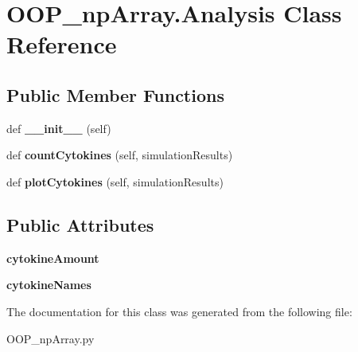 \hypertarget{class_o_o_p__np_array_1_1_analysis}{}\section{O\+O\+P\+\_\+np\+Array.\+Analysis Class Reference}
\label{class_o_o_p__np_array_1_1_analysis}
\subsection*{Public Member Functions}
\begin{DoxyCompactItemize}
\item 
\mbox{\label{class_o_o_p__np_array_1_1_analysis_a7a0c59492d240f1e2c12e5357b14d42a}} 
def {\bfseries \+\_\+\+\_\+init\+\_\+\+\_\+} (self)
\item 
\mbox{\label{class_o_o_p__np_array_1_1_analysis_a862e82b32a1059f7e85c6af2cafd92b3}} 
def {\bfseries count\+Cytokines} (self, simulation\+Results)
\item 
\mbox{\label{class_o_o_p__np_array_1_1_analysis_aed7eba5773c07b47d905869251898f62}} 
def {\bfseries plot\+Cytokines} (self, simulation\+Results)
\end{DoxyCompactItemize}
\subsection*{Public Attributes}
\begin{DoxyCompactItemize}
\item 
\mbox{\label{class_o_o_p__np_array_1_1_analysis_a0d725e11b898861453a55b234617348d}} 
{\bfseries cytokine\+Amount}
\item 
\mbox{\label{class_o_o_p__np_array_1_1_analysis_a6617ebceb7332d29e18f1be6f72f38cb}} 
{\bfseries cytokine\+Names}
\end{DoxyCompactItemize}


The documentation for this class was generated from the following file\+:\begin{DoxyCompactItemize}
\item 
O\+O\+P\+\_\+np\+Array.\+py\end{DoxyCompactItemize}
